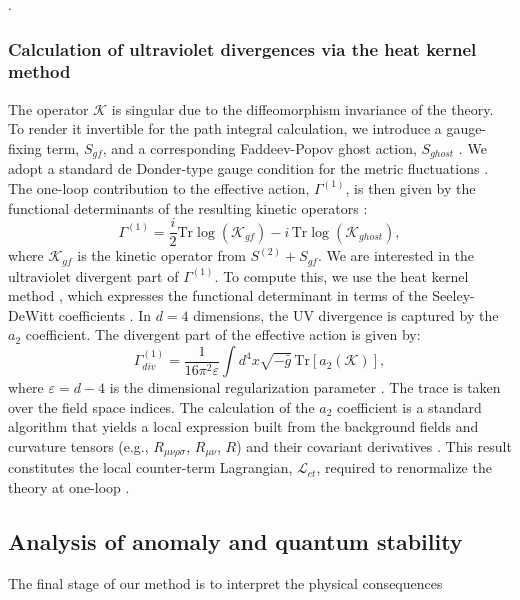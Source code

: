 \documentclass[twocolumn]{aastex631}
\begin{document}
\citep{zhu2021scalartensorperturbationsdhost,achour2024nonlineargravitationalwaveshorndeski}.\subsubsection{Calculation of ultraviolet divergences via the heat kernel method}The operator $\mathcal{K}$ is singular due to the diffeomorphism invariance of the theory. To render it invertible for the path integral calculation, we introduce a gauge-fixing term, $S_{gf}$, and a corresponding Faddeev-Popov ghost action, $S_{ghost}$  \citep{jakobsen2020schwarzschildtangherlinimetricscatteringamplitudes,kugo2022covariantbrstquantizationunimodular}. We adopt a standard de Donder-type gauge condition for the metric fluctuations  \citep{jakobsen2020schwarzschildtangherlinimetricscatteringamplitudes,dolan2022gravitationalperturbationsrotatingblack}. The one-loop contribution to the effective action, $\Gamma^{(1)}$, is then given by the functional determinants of the resulting kinetic operators  \citep{jakobsen2020schwarzschildtangherlinimetricscatteringamplitudes}:\begin{equation}\Gamma^{(1)} = \frac{i}{2} \text{Tr} \log(\mathcal{K}_{gf}) - i \, \text{Tr} \log(\mathcal{K}_{ghost}),\end{equation}where $\mathcal{K}_{gf}$ is the kinetic operator from $S^{(2)} + S_{gf}$. We are interested in the ultraviolet divergent part of $\Gamma^{(1)}$. To compute this, we use the heat kernel method \citep{shoji2025regularizationfunctionaldeterminantsradial,mehta2025heatkernelmethodsfirstorder,carosi2026equivalentmethodsfunctionaldeterminants}, which expresses the functional determinant in terms of the Seeley-DeWitt coefficients \citep{zingg2019modifiedheatequationsanalytic,shoji2025regularizationfunctionaldeterminantsradial}. In $d=4$ dimensions, the UV divergence is captured by the $a_2$ coefficient. The divergent part of the effective action is given by:\begin{equation}\Gamma^{(1)}_{div} = \frac{1}{16\pi^2 \varepsilon} \int d^4x \sqrt{-\bar{g}} \, \text{Tr}[a_2(\mathcal{K})],\end{equation}where $\varepsilon = d-4$ is the dimensional regularization parameter \citep{béluscamaïto2020dimensionalregularizationbreitenlohnermaison,solera2026symmetryrestoringfinitecountertermssmeft}. The trace is taken over the field space indices. The calculation of the $a_2$ coefficient is a standard algorithm that yields a local expression built from the background fields and curvature tensors (e.g., $R_{\mu\nu\rho\sigma}$, $R_{\mu\nu}$, $R$) and their covariant derivatives \citep{pronin1997oneloopcountertermsdimensionalregularization}. This result constitutes the local counter-term Lagrangian, $\mathcal{L}_{ct}$, required to renormalize the theory at one-loop \citep{pronin1997oneloopcountertermsdimensionalregularization,béluscamaïto2020dimensionalregularizationbreitenlohnermaison}.\subsection{Analysis of anomaly and quantum stability}The final stage of our method is to interpret the physical consequences 
\end{document}
